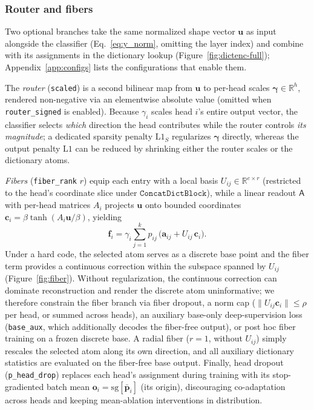 \subsubsection{Router and fibers}
\label{sec:router-fiber}
Two optional branches take the same normalized shape vector $\mathbf{u}$
as input alongside the classifier (Eq.~\eqref{eq:y_norm}, omitting the
layer index) and combine with its assignments in the dictionary lookup
(Figure~\ref{fig:dictenc-full}); Appendix~\ref{app:configs} lists the
configurations that enable them.

The \emph{router} (\texttt{scaled}) is a second bilinear map from
$\mathbf{u}$ to per-head scales $\boldsymbol{\gamma} \in \mathbb{R}^h$,
rendered non-negative via an elementwise absolute value (omitted when
\texttt{router\_signed} is enabled). Because $\gamma_i$ scales head $i$'s
entire output vector, the classifier selects \emph{which} direction the
head contributes while the router controls \emph{its magnitude}; a
dedicated sparsity penalty $\mathrm{L1}_S$ regularizes
$\boldsymbol{\gamma}$ directly, whereas the output penalty $\mathrm{L1}$
can be reduced by shrinking either the router scales or the dictionary
atoms.

\emph{Fibers} (\texttt{fiber\_rank} $r$) equip each entry with a local
basis $U_{ij} \in \mathbb{R}^{e \times r}$ (restricted to the head's
coordinate slice under $\mathtt{ConcatDictBlock}$), while a linear
readout $\mathsf{A}$ with per-head matrices $A_i$ projects $\mathbf{u}$
onto bounded coordinates $\mathbf{c}_i = \beta\tanh(A_i\mathbf{u}/\beta)$,
yielding
\begin{equation}
	\mathbf{f}_i = \gamma_i \sum^{k}_{j=1} p_{ij}\,\big(\mathbf{a}_{ij}
	      + U_{ij}\,\mathbf{c}_i\big).
	\label{eq:fiber}
\end{equation}
Under a hard code, the selected atom serves as a discrete base point and
the fiber term provides a continuous correction within the subspace
spanned by $U_{ij}$ (Figure~\ref{fig:fiber}). Without regularization, the
continuous correction can dominate reconstruction and render the discrete
atom uninformative; we therefore constrain the fiber branch via fiber
dropout, a norm cap ($\lVert U_{ij}\mathbf{c}_i\rVert \le \rho$ per head,
or summed across heads), an auxiliary base-only deep-supervision loss
(\texttt{base\_aux}, which additionally decodes the fiber-free output),
or post hoc fiber training on a frozen discrete base. A radial fiber
($r{=}1$, without $U_{ij}$) simply rescales the selected atom along its
own direction, and all auxiliary dictionary statistics are evaluated on
the fiber-free base output. Finally, head dropout
(\texttt{p\_head\_drop}) replaces each head's assignment during training
with its stop-gradiented batch mean $\mathbf{o}_i =
\mathrm{sg}[\bar{\mathbf{p}}_i]$ (its origin), discouraging
co-adaptation across heads and keeping mean-ablation interventions in
distribution.

